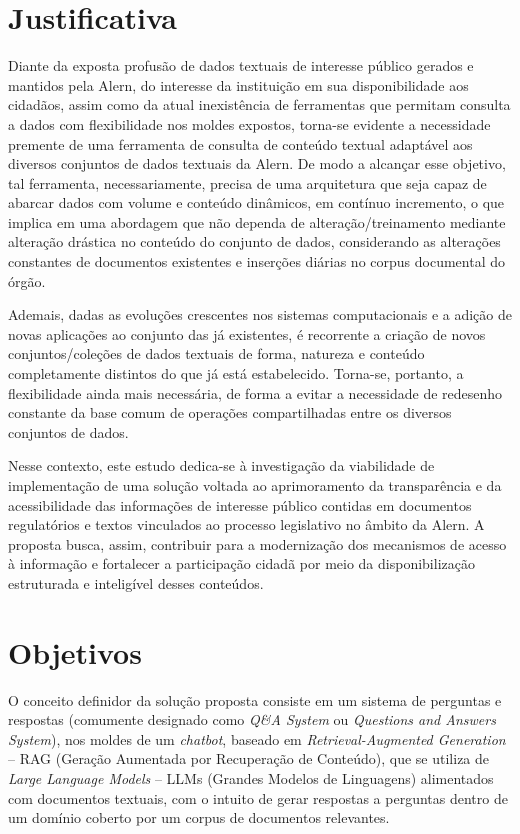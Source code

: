 \section{Justificativa}

Diante da exposta profusão de dados textuais de interesse público gerados e mantidos pela \ac{Alern}, do interesse da instituição em sua disponibilidade aos cidadãos, assim como da atual inexistência de ferramentas que permitam consulta a dados com flexibilidade nos moldes expostos, torna-se evidente a necessidade premente de uma ferramenta de consulta de conteúdo textual adaptável aos diversos conjuntos de dados textuais da \ac{Alern}. De modo a alcançar esse objetivo, tal ferramenta, necessariamente, precisa de uma arquitetura que seja capaz de abarcar dados com volume e conteúdo dinâmicos, em contínuo incremento, o que implica em uma abordagem que não dependa de alteração/treinamento mediante alteração drástica no conteúdo do conjunto de dados, considerando as alterações constantes de documentos existentes e inserções diárias no corpus documental do órgão.

Ademais, dadas as evoluções crescentes nos sistemas computacionais e a adição de novas aplicações ao conjunto das já existentes, é recorrente a criação de novos conjuntos/coleções de dados textuais de forma, natureza e conteúdo completamente distintos do que já está estabelecido. Torna-se, portanto, a flexibilidade ainda mais necessária, de forma a evitar a necessidade de redesenho constante da base comum de operações compartilhadas entre os diversos conjuntos de dados.

Nesse contexto, este estudo dedica-se à investigação da viabilidade de implementação de uma solução voltada ao aprimoramento da transparência e da acessibilidade das informações de interesse público contidas em documentos regulatórios e textos vinculados ao processo legislativo no âmbito da \ac{Alern}. A proposta busca, assim, contribuir para a modernização dos mecanismos de acesso à informação e fortalecer a participação cidadã por meio da disponibilização estruturada e inteligível desses conteúdos.

\section{Objetivos}
\label{sec:Introducao.1}

O conceito definidor da solução proposta consiste em um sistema de perguntas e respostas (comumente designado como \textit{Q\&A System} ou \textit{Questions and Answers System}), nos moldes de um \textit{chatbot}, baseado em \textit{Retrieval-Augmented Generation} -- RAG (Geração Aumentada por Recuperação de Conteúdo), que se utiliza de \textit{Large Language Models} -- LLMs (Grandes Modelos de Linguagens) alimentados com documentos textuais, com o intuito de gerar respostas a perguntas dentro de um domínio coberto por um corpus de documentos relevantes.

